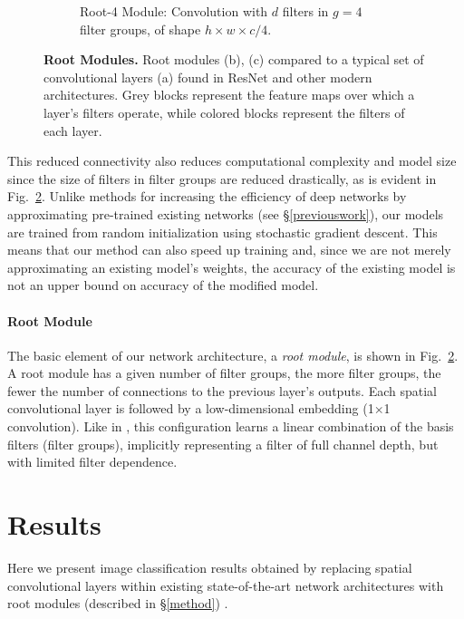 \documentclass[thesis]{subfiles}
\begin{document}
\begin{figure}[tb]
\begin{subfigure}[b]{0.6\linewidth}
			\caption{Root-4 Module: Convolution with $d$ filters in $g = 4$ filter groups, of shape $h\times w\times c/4$.}
			\label{fig:rootresnet4}
		\end{subfigure}
		\caption{\textbf{Root Modules.} Root modules (b), (c) compared to a typical set of convolutional layers (a) found in ResNet and other modern architectures. Grey blocks represent the feature maps over which a layer's filters operate, while colored blocks represent the filters of each layer. 
		}
		\label{fig:rootmodule}
	\end{figure}
	This reduced connectivity also reduces computational complexity and model size since the size of filters in filter groups are reduced drastically, as is evident in Fig.~\ref{fig:rootmodule}. Unlike methods for increasing the efficiency of deep networks by approximating pre-trained existing networks (see \S\ref{previouswork}), our models are trained from random initialization using stochastic gradient descent. This means that our method can also speed up training and, since we are not merely approximating an existing model's weights, the accuracy of the existing model is not an upper bound on accuracy of the modified model.
	
	\paragraph{Root Module}
	The basic element of our network architecture, a \emph{root module}, is shown in Fig.~\ref{fig:rootmodule}. A root module has a given number of filter groups, the more filter groups, the fewer the number of connections to the previous layer's outputs. Each spatial convolutional layer is followed by a low-dimensional embedding (1$\times$1 convolution). Like in \citep{Ioannou2016}, this configuration  learns a linear combination of the basis filters (filter groups), implicitly representing a filter of full channel depth, but with limited filter dependence.
	
	\section{Results}
	Here we present image classification results obtained by replacing spatial convolutional layers within existing state-of-the-art network architectures with root modules (described in \S\ref{method}) .
	
\end{document}
